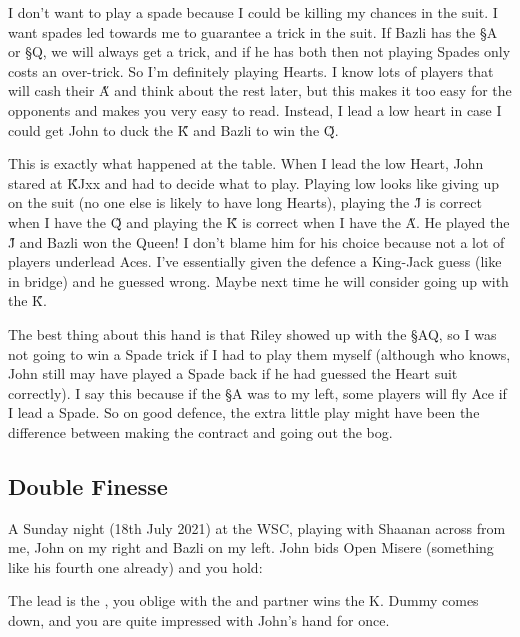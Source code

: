 \documentclass[a4paper]{JoshCards}
\begin{document}
I don't want to play a spade because I could be killing my chances in the suit. I want spades led towards me to guarantee a trick in the suit. If Bazli has the \S A or \S Q, we will always get a trick, and if he has both then not playing Spades only costs an over-trick. So I'm definitely playing Hearts. I know lots of players that will cash their \H A and think about the rest later, but this makes it too easy for the opponents and makes you very easy to read. Instead, I lead a low heart in case I could get John to duck the \H K and Bazli to win the \H Q.

 This is exactly what happened at the table. When I lead the low Heart, John stared at \H KJxx and had to decide what to play. Playing low looks like giving up on the suit (no one else is likely to have long Hearts), playing the \H J is correct when I have the \H Q and playing the \H K is correct when I have the \H A. He played the \H J and Bazli won the Queen! I don't blame him for his choice because not a lot of players underlead Aces. I've essentially given the defence a King-Jack guess (like in bridge) and he guessed wrong. Maybe next time he will consider going up with the \H K.

 The best thing about this hand is that Riley showed up with the \S AQ, so I was not going to win a Spade trick if I had to play them myself (although who knows, John still may have played a Spade back if he had guessed the Heart suit correctly). I say this because if the \S A was to my left, some players will fly Ace if I lead a Spade. So on good defence, the extra little play might have been the difference between making the contract and going out the bog.



\newpage
\subsection*{Double Finesse}

A Sunday night (18th July 2021) at the WSC, playing with Shaanan across from me, John on my right and Bazli on my left. John bids Open Misere (something like his fourth one already) and you hold:
\begin{center}
\end{center}
The lead is the , you oblige with the  and partner wins the \C K. Dummy comes down, and you are quite impressed with John's hand for once.
\gamefont{\larger}
\northhand{}{}{}{}
\westhand{}{}{}{}
\leftupper{}%
{}{}
\rightlower{}{}{}
\showAll*
\end{document}
